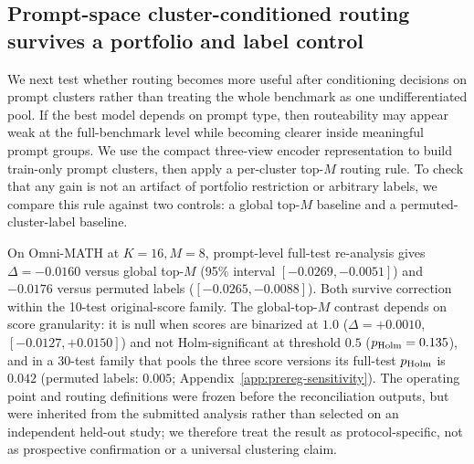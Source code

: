 \documentclass{article}
\begin{document}
\subsection{Prompt-space cluster-conditioned routing survives a portfolio and label control}
\label{sec:prompt-cluster}
We next test whether routing becomes more useful after conditioning decisions on prompt clusters rather than treating the whole benchmark as one undifferentiated pool. If the best model depends on prompt type, then routeability may appear weak at the full-benchmark level while becoming clearer inside meaningful prompt groups. We use the compact three-view encoder representation to build train-only prompt clusters, then apply a per-cluster top-$M$ routing rule. To check that any gain is not an artifact of portfolio restriction or arbitrary labels, we compare this rule against two controls: a global top-$M$ baseline and a permuted-cluster-label baseline.

On Omni-MATH at $K=16,M=8$, prompt-level full-test re-analysis gives $\Delta=-0.0160$ versus global top-$M$ (95\% interval $[-0.0269,-0.0051]$) and $-0.0176$ versus permuted labels ($[-0.0265,-0.0088]$). Both survive correction within the 10-test original-score family. The global-top-$M$ contrast depends on score granularity: it is null when scores are binarized at $1.0$ ($\Delta=+0.0010$, $[-0.0127,+0.0150]$) and not Holm-significant at threshold $0.5$ ($p_{\rm Holm}=0.135$), and in a 30-test family that pools the three score versions its full-test $p_{\rm Holm}$ is $0.042$ (permuted labels: $0.005$; Appendix~\ref{app:prereg-sensitivity}). The operating point and routing definitions were frozen before the reconciliation outputs, but were inherited from the submitted analysis rather than selected on an independent held-out study; we therefore treat the result as protocol-specific, not as prospective confirmation or a universal clustering claim.

\begin{table}[t]
  \caption{Protocol-specific Omni-MATH portfolio results. Signs depend on the declared estimand; rows are not independent replications.}
  \label{tab:portfolio-summary}
  \centering
  \scriptsize
\end{table}
\end{document}
